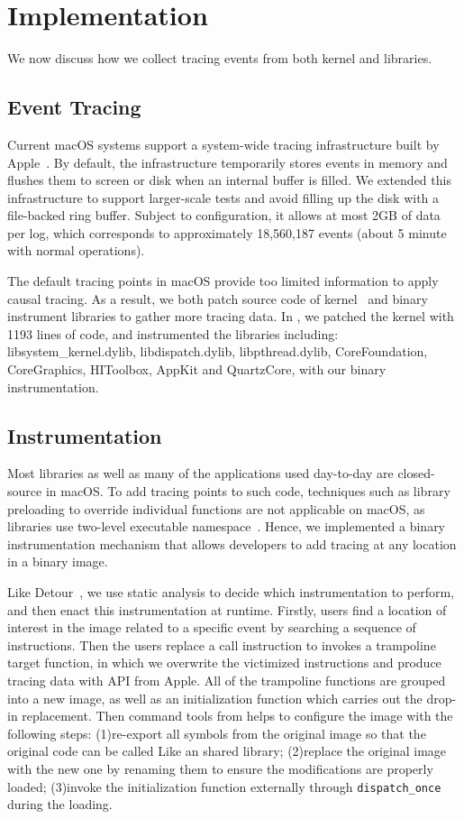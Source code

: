 \section{Implementation}\label{sec:implementation}
We now discuss how we collect tracing events from both kernel and libraries.

\subsection{Event Tracing}
Current macOS systems support a system-wide tracing infrastructure built by
Apple~\cite{linktotracetool}. By default, the infrastructure temporarily stores
events in memory and flushes them to screen or disk when an internal buffer is
filled. We extended this infrastructure to support larger-scale tests and avoid
filling up the disk with a file-backed ring buffer. Subject to configuration,
it allows at most 2GB of data per log, which corresponds to approximately
18,560,187 events (about 5 minute with normal operations).

The default tracing points in macOS provide too limited information to
apply causal tracing. As a result, we both patch source code of kernel~\cite{linkofxnusourcecode} and binary instrument libraries to gather
more tracing data. In \xxx, we patched the kernel with 1193 lines of
code, and instrumented the libraries including: libsystem\_kernel.dylib,
libdispatch.dylib, libpthread.dylib, CoreFoundation, CoreGraphics, HIToolbox,
AppKit and QuartzCore, with our binary instrumentation.

\subsection{Instrumentation}
Most libraries as well as many of the applications used day-to-day are
closed-source in macOS. To add tracing points to such code, techniques such as
library preloading to override individual functions are not applicable on macOS,
as libraries use two-level executable namespace~\cite{twolayernamespace}. Hence, we implemented
a binary instrumentation mechanism that allows developers to add tracing at
any location in a binary image.

Like Detour~\cite{hunt1999detours}, we use static analysis to decide which
instrumentation to perform, and then enact this instrumentation at runtime.
Firstly, users find a location of interest in the image related to a specific
event by searching a sequence of instructions. Then the users replace a call
instruction to invokes a trampoline target function, in which we overwrite the
victimized instructions and produce tracing data with API from Apple. All of the
trampoline functions are grouped into a new image, as well as an initialization
function which carries out the drop-in replacement. Then command tools from
\xxx helps to configure the image with the following steps: (1)re-export all
symbols from the original image so that the original code can be called Like an
shared library; (2)replace the original image with the new one by renaming them
to ensure the modifications are properly loaded; (3)invoke the initialization
function externally through \texttt{dispatch\_once} during the loading.

